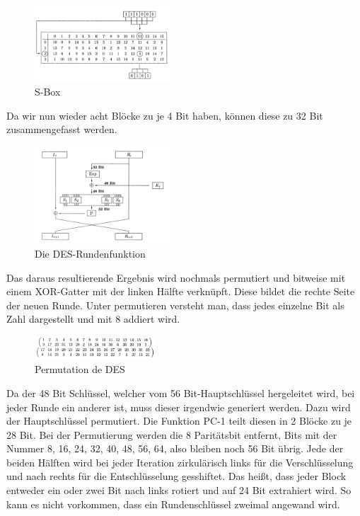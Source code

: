 \documentclass[11pt]{scrartcl}
\begin{document}
\begin{figure}[H]
\includegraphics[width=0.45\textwidth]{Bilder/DES/S-Box}
	\caption{S-Box \cite{2}}
	\label{fig2}
\end{figure}
\noindent Da wir nun wieder acht Blöcke zu je 4 Bit haben, können diese zu 32 Bit zusammengefasst werden. \cite{2}
\begin{figure}[H]
\includegraphics[width=0.45\textwidth]{Bilder/DES/DES_Rundenfunktion}
	\caption{Die DES-Rundenfunktion \cite{2}}
	\label{fig3}
\end{figure}
\noindent Das daraus resultierende Ergebnis wird nochmals permutiert und bitweise mit einem XOR-Gatter mit der linken Hälfte verknüpft. Diese \grqq{}bildet die rechte Seite der neuen Runde.\grqq{}\cite{2} Unter permutieren versteht man, dass jedes einzelne Bit als Zahl dargestellt und mit 8 addiert wird. \cite{2}
\begin{figure}[H]
\includegraphics[width=0.40\textwidth]{Bilder/DES/DES_Permutation}
	\caption{Permutation de DES \cite{2}}
	\label{fig4}
\end{figure}
\noindent 
Da der 48 Bit Schlüssel, welcher vom 56 Bit-Hauptschlüssel hergeleitet wird, bei jeder Runde ein anderer ist, muss dieser irgendwie generiert werden. Dazu wird der Hauptschlüssel permutiert. Die Funktion PC-1 teilt diesen in 2 Blöcke zu je 28 Bit. Bei der Permutierung werden die 8 Paritätsbit entfernt, Bits mit der Nummer 8, 16, 24, 32, 40, 48, 56, 64, also bleiben noch 56 Bit übrig. Jede der beiden Hälften wird bei jeder Iteration zirkulärisch links für die Verschlüsselung und nach rechts für die Entschlüsselung gesshiftet. Das heißt, dass jeder Block entweder ein oder zwei Bit nach links rotiert und auf 24 Bit extrahiert wird. So kann es nicht vorkommen, dass ein Rundenschlüssel zweimal angewand wird.\\
\end{document}
